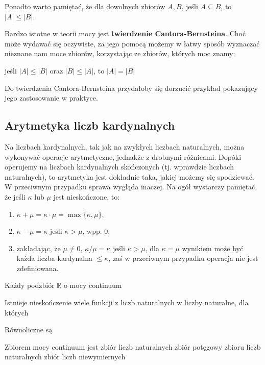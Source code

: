 Ponadto warto pamiętać, że dla dowolnych zbiorów $A, B$, jeśli $A \subseteq B$, to $|A| \leq |B|$.

Bardzo istotne w teorii mocy jest \textbf{twierdzenie Cantora-Bernsteina}. Choć może wydawać się oczywiste, za jego pomocą możemy w łatwy sposób wyznaczać nieznane nam moce zbiorów, korzystając ze zbiorów, których moc znamy:
\begin{center}
    jeśli $|A| \leq |B|$ oraz $|B| \leq |A|$, to $|A| = |B|$
\end{center}

\begin{editorsnote}
    Do twierdzenia Cantora-Bernsteina przydałoby się dorzucić przykład pokazujący jego zastosowanie w praktyce.
\end{editorsnote}

\subsection{Arytmetyka liczb kardynalnych}

Na liczbach kardynalnych, tak jak na zwykłych liczbach naturalnych, można wykonywać operacje arytmetyczne, jednakże z drobnymi różnicami. Dopóki operujemy na liczbach kardynalnych skończonych (tj. wprawdzie liczbach naturalnych), to arytmetyka jest dokładnie taka, jakiej możemy się spodziewać. W przeciwnym przypadku sprawa wygląda inaczej. Na ogół wystarczy pamiętać, że jeśli $\kappa$ lub $\mu$ jest nieskończone, to:
\begin{enumerate}
    \item $\kappa + \mu = \kappa \cdot \mu = \max\{\kappa, \mu\}$,
    \item $\kappa - \mu = \kappa$ jeśli $\kappa > \mu$, wpp. 0,
    \item zakładając, że $\mu \not= 0$, $\kappa / \mu = \kappa$ jeśli $\kappa > \mu$, dla $\kappa = \mu$ wynikiem może być każda liczba kardynalna $\leqslant \kappa$, zaś w przeciwnym przypadku operacja nie jest zdefiniowana.
\end{enumerate}

\begin{problems}
    \prob Każdy podzbiór $\mathbb{R}$ o mocy continuum

    \prob Istnieje nieskończenie wiele funkcji z liczb naturalnych w liczby naturalne, dla których

    \prob Równoliczne są

    \prob Zbiorem mocy continuum jest
    \answers
    {zbiór liczb naturalnych}
    {zbiór potęgowy zbioru liczb naturalnych}
    {zbiór liczb niewymiernych}
\end{problems}

